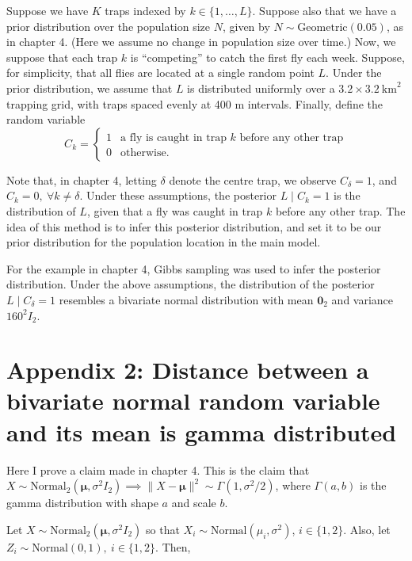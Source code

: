 \documentclass[
  oneside]{book}
\begin{document}
Suppose we have \(K\) traps indexed by \(k \in \{1, \ldots, L\}\). Suppose also that we have a prior distribution over the population size \(N\), given by \(N \sim \mathrm{Geometric} (0.05)\), as in chapter 4. (Here we assume no change in population size over time.) Now, we suppose that each trap \(k\) is ``competing'' to catch the first fly each week. Suppose, for simplicity, that all flies are located at a single random point \(L\). Under the prior distribution, we assume that \(L\) is distributed uniformly over a \(3.2 \times 3.2 ~ \mathrm{km}^2\) trapping grid, with traps spaced evenly at 400 m intervals. Finally, define the random variable
\[
C_k = \begin{cases}1 & \text{a fly is caught in trap } k \text{ before any other trap} \\ 0 & \text{otherwise}. \end{cases}
\]

Note that, in chapter 4, letting \(\delta\) denote the centre trap, we observe \(C_\delta=1\), and \(C_k = 0, ~ \forall k \neq \delta\). Under these assumptions, the posterior \(L \mid C_k = 1\) is the distribution of \(L\), given that a fly was caught in trap \(k\) before any other trap. The idea of this method is to infer this posterior distribution, and set it to be our prior distribution for the population location in the main model.

For the example in chapter 4, Gibbs sampling was used to infer the posterior distribution. Under the above assumptions, the distribution of the posterior \(L \mid C_\delta = 1\) resembles a bivariate normal distribution with mean \(\mathbf 0_2\) and variance \(160^2 I_2\).

\hypertarget{appendix-2-distance-between-a-bivariate-normal-random-variable-and-its-mean-is-gamma-distributed}{%
\section{Appendix 2: Distance between a bivariate normal random variable and its mean is gamma distributed}\label{appendix-2-distance-between-a-bivariate-normal-random-variable-and-its-mean-is-gamma-distributed}}

Here I prove a claim made in chapter 4. This is the claim that \(X \sim \mathrm {Normal}_2 (\pmb \mu, \sigma^2 I_2) \implies \lVert X - \pmb \mu \rVert^2 \sim \Gamma(1, \sigma^2/2)\), where \(\Gamma(a, b)\) is the gamma distribution with shape \(a\) and scale \(b\).

Let \(X \sim \mathrm {Normal}_2 (\pmb \mu, \sigma^2 I_2)\) so that \(X_i \sim \mathrm{Normal}(\mu_i, \sigma^2)\), \(i \in \{1, 2\}\). Also, let \(Z_i \sim \mathrm{Normal}(0, 1), ~ i \in \{1, 2\}\). Then,
\end{document}
